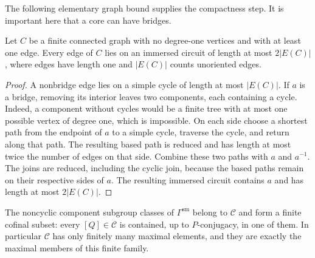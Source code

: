 The following elementary graph bound supplies the compactness step.
It is important here that a core can have bridges.

\begin{lemma}
\label{car:circuits}
Let $C$ be a finite connected graph with no degree-one vertices and
with at least one edge.  Every edge of $C$ lies on an immersed circuit
of length at most $2|E(C)|$, where edges have length one and
$|E(C)|$ counts unoriented edges.
\end{lemma}

\begin{proof}
A nonbridge edge lies on a simple cycle of length at most $|E(C)|$.
If $a$ is a bridge, removing its interior leaves two components,
each containing a cycle.  Indeed, a component without cycles would
be a finite tree with at most one possible vertex of degree one,
which is impossible.  On each side choose a shortest path from
the endpoint of $a$ to a simple cycle, traverse the cycle, and
return along that path.  The resulting based path is reduced and
has length at most twice the number of edges on that side.
Combine these two paths with $a$ and $a^{-1}$.  The joins are
reduced, including the cyclic join, because the based paths remain
on their respective sides of $a$.  The resulting immersed circuit
contains $a$ and has length at most $2|E(C)|$.
\end{proof}

\begin{proposition}
\label{car:finite-carriers}
The noncyclic component subgroup classes of
$\Gamma^{\mathrm{sm}}$ belong to $\mathcal C$ and form a finite
cofinal subset: every $[Q]\in\mathcal C$ is contained, up to
$P$-conjugacy, in one of them.  In particular $\mathcal C$ has only
finitely many maximal elements, and they are exactly the maximal
members of this finite family.
\end{proposition}

